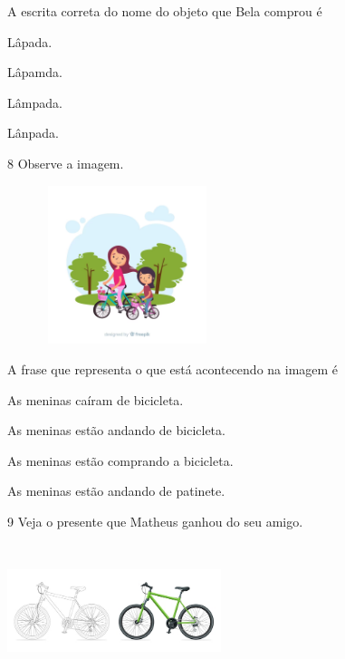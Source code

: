 A escrita correta do nome do objeto que Bela comprou é

\begin{escolha}
\item Lâpada.

\item Lâpamda.

\item Lâmpada.

\item Lânpada.
\end{escolha}

\num{8} Observe a imagem.

\includegraphics[width=2.76266in,height=1.82051in]{media/image179.png}


A frase que representa o que está acontecendo na imagem é

\begin{escolha}
\item As meninas caíram de bicicleta.

\item As meninas estão andando de bicicleta.

\item As meninas estão comprando a bicicleta.

\item As meninas estão andando de patinete.
\end{escolha}


\num{9} Veja o presente que Matheus ganhou do seu amigo.

\includegraphics[width=2.46250in,height=1.54444in]{media/image180.jpeg}

